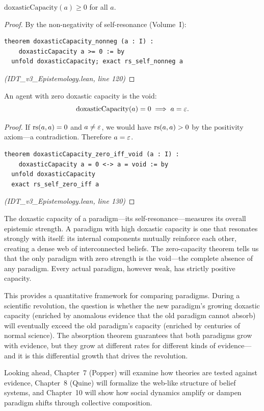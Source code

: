 \begin{theorem}
\label{thm:doxastic-nonneg}
$\mathrm{doxasticCapacity}(a) \geq 0$ for all $a$.
\end{theorem}

\begin{proof}
By the non-negativity of self-resonance (Volume~I):
\begin{lstlisting}
theorem doxasticCapacity_nonneg (a : I) :
    doxasticCapacity a >= 0 := by
  unfold doxasticCapacity; exact rs_self_nonneg a
\end{lstlisting}
\textit{(IDT\_v3\_Epistemology.lean, line 120)}
\end{proof}

\begin{theorem}
\label{thm:zero-capacity-void}
An agent with zero doxastic capacity is the void:
\[
  \mathrm{doxasticCapacity}(a) = 0 \implies a = \varepsilon.
\]
\end{theorem}

\begin{proof}
If $\mathrm{rs}(a, a) = 0$ and $a \neq \varepsilon$, we would have $\mathrm{rs}(a, a) > 0$ by
the positivity axiom---a contradiction. Therefore $a = \varepsilon$.
\begin{lstlisting}
theorem doxasticCapacity_zero_iff_void (a : I) :
    doxasticCapacity a = 0 <-> a = void := by
  unfold doxasticCapacity
  exact rs_self_zero_iff a
\end{lstlisting}
\textit{(IDT\_v3\_Epistemology.lean, line 130)}
\end{proof}

\begin{interpretation}
The doxastic capacity of a paradigm---its self-resonance---measures its overall
epistemic strength. A paradigm with high doxastic capacity is one that resonates
strongly with itself: its internal components mutually reinforce each other,
creating a dense web of interconnected beliefs. The zero-capacity theorem tells
us that the only paradigm with zero strength is the void---the complete absence
of any paradigm. Every actual paradigm, however weak, has strictly positive
capacity.

This provides a quantitative framework for comparing paradigms. During a
scientific revolution, the question is whether the new paradigm's growing
doxastic capacity (enriched by anomalous evidence that the old paradigm cannot
absorb) will eventually exceed the old paradigm's capacity (enriched by
centuries of normal science). The absorption theorem guarantees that both
paradigms grow with evidence, but they grow at different rates for different
kinds of evidence---and it is this differential growth that drives the revolution.

Looking ahead, Chapter~7 (Popper) will examine how theories are tested against
evidence, Chapter~8 (Quine) will formalize the web-like structure of belief
systems, and Chapter~10 will show how social dynamics amplify or dampen
paradigm shifts through collective composition.
\end{interpretation}

